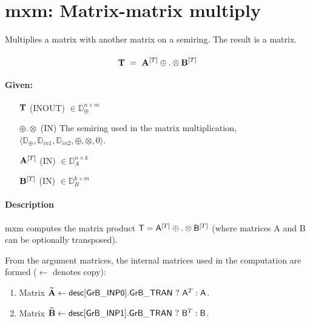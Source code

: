 \section{{\sf mxm}: Matrix-matrix multiply}

Multiplies a matrix with another matrix on a semiring. The result is a matrix.

\paragraph{\syntax}

$$
{\bf T} ~ = ~ {\bf A}^{[T]} \oplus.\otimes {\bf B}^{[T]}
$$

\paragraph{Given:}

\begin{itemize}[leftmargin=0.7in]
    \item[${\bf T}$]    ({\sf INOUT}) $\in \mathbb{D}_\oplus^{n\times m}$
    
    \item[$\oplus.\otimes$]   ({\sf IN}) The semiring used in the matrix
    multiplication, $\langle \mathbb{D}_\oplus, \mathbb{D}_{in1},\mathbb{D}_{in2},\oplus,\otimes,0 \rangle$.

    \item[${\bf A}^{[T]}$]    ({\sf IN}) $\in \mathbb{D}_A^{n\times k}$

    \item[${\bf B}^{[T]}$]    ({\sf IN}) $\in \mathbb{D}_B^{k\times m}$

\end{itemize}


\paragraph{Description}

{\sf mxm} computes the matrix product ${\sf T} = {\sf
A}^{[T]} \oplus . \otimes {\sf B}^{[T]}$ (where matrices {\sf A}
and {\sf B} can be optionally transposed).  




From the argument matrices, the internal matrices used in 
the computation are formed ($\leftarrow$ denotes copy): 
\begin{enumerate}

	\item Matrix ${\bf \widetilde{A}} \leftarrow
    {\sf desc[GrB\_INP0].GrB\_TRAN} \ ? \ {\sf A}^T : {\sf A}$.

	\item Matrix ${\bf \widetilde{B}} \leftarrow
    {\sf desc[GrB\_INP1].GrB\_TRAN} \ ? \ {\sf B}^T : {\sf B}$.
\end{enumerate}

